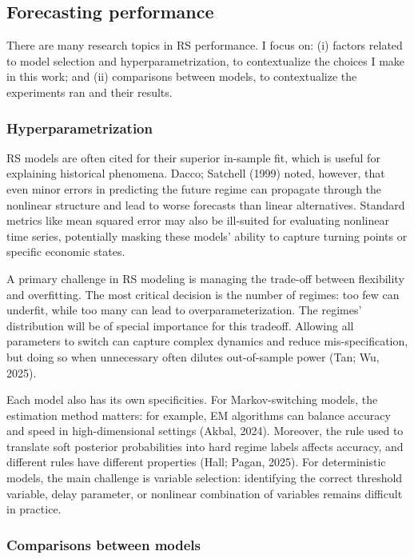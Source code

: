 \documentclass[
  letterpaper,
  DIV=11,
  numbers=noendperiod]{scrartcl}
\numberwithin{equation}{section}
\numberwithin{table}{section}
\numberwithin{figure}{section}
\begin{document}
\subsection{Forecasting performance}\label{forecasting-performance}

There are many research topics in RS performance. I focus on: (i)
factors related to model selection and hyperparametrization, to
contextualize the choices I make in this work; and (ii) comparisons
between models, to contextualize the experiments ran and their results.

\subsubsection{Hyperparametrization}\label{hyperparametrization}

RS models are often cited for their superior in-sample fit, which is
useful for explaining historical phenomena. Dacco; Satchell (1999)
noted, however, that even minor errors in predicting the future regime
can propagate through the nonlinear structure and lead to worse
forecasts than linear alternatives. Standard metrics like mean squared
error may also be ill-suited for evaluating nonlinear time series,
potentially masking these models' ability to capture turning points or
specific economic states.

A primary challenge in RS modeling is managing the trade-off between
flexibility and overfitting. The most critical decision is the number of
regimes: too few can underfit, while too many can lead to
overparameterization. The regimes' distribution will be of special
importance for this tradeoff. Allowing all parameters to switch can
capture complex dynamics and reduce mis-specification, but doing so when
unnecessary often dilutes out-of-sample power (Tan; Wu, 2025).

Each model also has its own specificities. For Markov-switching models,
the estimation method matters: for example, EM algorithms can balance
accuracy and speed in high-dimensional settings (Akbal, 2024). Moreover,
the rule used to translate soft posterior probabilities into hard regime
labels affects accuracy, and different rules have different properties
(Hall; Pagan, 2025). For deterministic models, the main challenge is
variable selection: identifying the correct threshold variable, delay
parameter, or nonlinear combination of variables remains difficult in
practice.

\subsubsection{Comparisons between
models}\label{comparisons-between-models}
\end{document}

